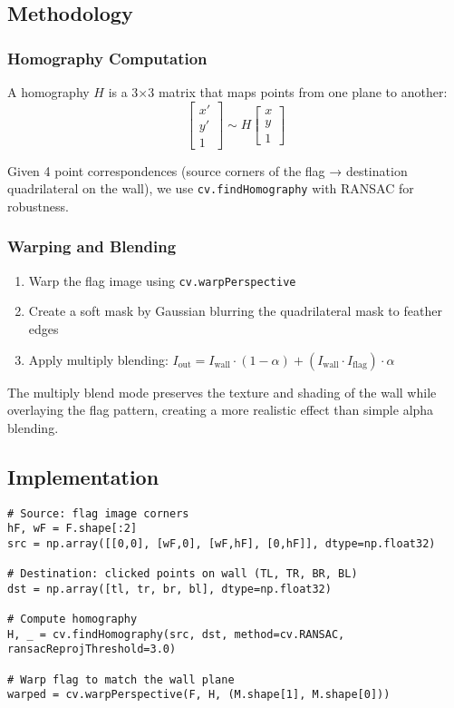 \documentclass[11pt,a4paper]{article}
\begin{document}
\subsection{Methodology}

\subsubsection{Homography Computation}
A homography $H$ is a 3×3 matrix that maps points from one plane to another:
\[
\begin{bmatrix} x' \\ y' \\ 1 \end{bmatrix} \sim H \begin{bmatrix} x \\ y \\ 1 \end{bmatrix}
\]

Given 4 point correspondences (source corners of the flag → destination quadrilateral on the wall), we use \texttt{cv.findHomography} with RANSAC for robustness.

\subsubsection{Warping and Blending}
\begin{enumerate}
    \item Warp the flag image using \texttt{cv.warpPerspective}
    \item Create a soft mask by Gaussian blurring the quadrilateral mask to feather edges
    \item Apply multiply blending: $I_{\text{out}} = I_{\text{wall}} \cdot (1 - \alpha) + (I_{\text{wall}} \cdot I_{\text{flag}}) \cdot \alpha$
\end{enumerate}

The multiply blend mode preserves the texture and shading of the wall while overlaying the flag pattern, creating a more realistic effect than simple alpha blending.

\subsection{Implementation}

\begin{lstlisting}[caption={Homography computation and warping}]
# Source: flag image corners
hF, wF = F.shape[:2]
src = np.array([[0,0], [wF,0], [wF,hF], [0,hF]], dtype=np.float32)

# Destination: clicked points on wall (TL, TR, BR, BL)
dst = np.array([tl, tr, br, bl], dtype=np.float32)

# Compute homography
H, _ = cv.findHomography(src, dst, method=cv.RANSAC, ransacReprojThreshold=3.0)

# Warp flag to match the wall plane
warped = cv.warpPerspective(F, H, (M.shape[1], M.shape[0]))
\end{lstlisting}
\end{document}
